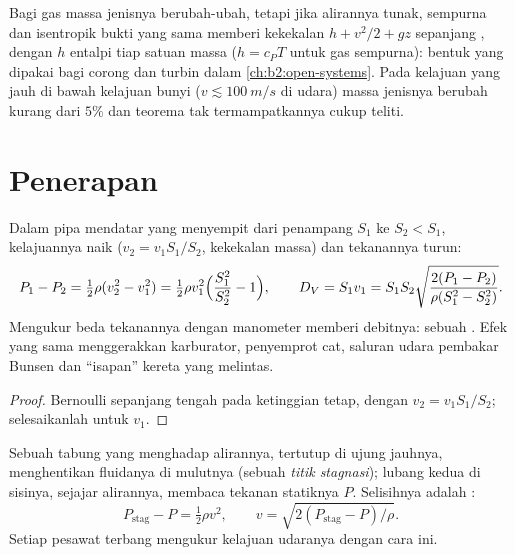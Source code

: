 \begin{remark}\label{rem:b2:euler-bernoulli:compressible}
Bagi gas massa jenisnya berubah-ubah, tetapi jika alirannya tunak,
sempurna dan isentropik bukti yang sama memberi kekekalan $h + v^2/2 + gz$
sepanjang , dengan $h$ entalpi tiap satuan massa ($h = c_PT$
untuk gas sempurna): bentuk yang dipakai bagi corong dan turbin dalam
\cref{ch:b2:open-systems}. Pada kelajuan yang jauh di bawah kelajuan bunyi
($v \lesssim \qty{100}{m/s}$ di udara) massa jenisnya berubah kurang dari $5\%$
dan teorema tak termampatkannya cukup teliti.
\end{remark}

\section{Penerapan}

\begin{proposition}\label{prop:b2:euler-bernoulli:venturi}
Dalam pipa mendatar yang menyempit dari penampang $S_1$ ke $S_2 < S_1$,
kelajuannya naik ($v_2 = v_1S_1/S_2$, kekekalan massa) dan tekanannya
turun:
\[
P_1 - P_2 = \tfrac12\rho(v_2^2 - v_1^2) = \tfrac12\rho v_1^2\Bigl(\frac{S_1^2}{S_2^2} - 1\Bigr) ,
\qquad
D_V = S_1v_1 = S_1S_2\sqrt{\frac{2(P_1 - P_2)}{\rho(S_1^2 - S_2^2)}} .
\]
Mengukur beda tekanannya dengan manometer memberi debitnya: sebuah
\emph{}. Efek yang sama menggerakkan karburator, penyemprot
cat, saluran udara pembakar Bunsen dan ``isapan'' kereta yang melintas.
\end{proposition}

\begin{proof}
Bernoulli sepanjang  tengah pada ketinggian tetap, dengan $v_2 =
v_1S_1/S_2$; selesaikanlah untuk $v_1$.
\end{proof}

\begin{proposition}\label{prop:b2:euler-bernoulli:pitot}
Sebuah tabung yang menghadap alirannya, tertutup di ujung jauhnya,
menghentikan fluidanya di mulutnya (sebuah \emph{titik stagnasi}); lubang
kedua di sisinya, sejajar alirannya, membaca tekanan statiknya $P$.
Selisihnya adalah :
\[
P_{\text{stag}} - P = \tfrac12\rho v^2 , \qquad v = \sqrt{2(P_{\text{stag}} - P)/\rho} .
\]
Setiap pesawat terbang mengukur kelajuan udaranya dengan cara ini.
\end{proposition}

